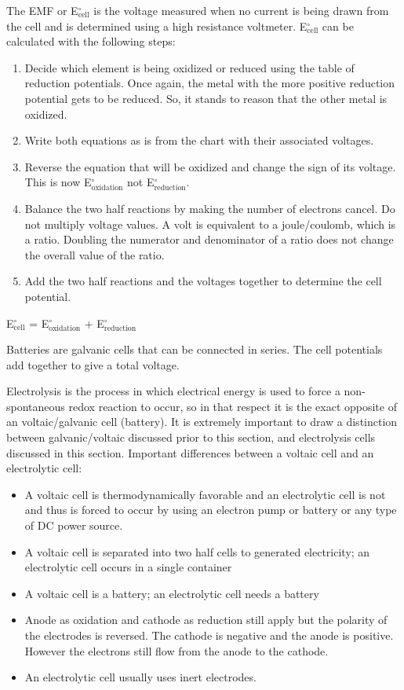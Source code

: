 \documentclass[../chem.tex]{subfiles}
\begin{document}
The EMF or E$^{\circ}_{\text{cell}}$ is the voltage measured when no current is being drawn from the cell and is determined using a high 
resistance voltmeter. E$^{\circ}_{\text{cell}}$ can be calculated with the following steps:
\begin{enumerate}
    \item Decide which element is being oxidized or reduced using the table of reduction potentials. Once again, the metal with the more positive reduction potential gets to be reduced. So, it stands to reason that the other metal is oxidized.
    \item Write both equations as is from the chart with their associated voltages.
    \item Reverse the equation that will be oxidized and change the sign of its voltage. This is now E$^{\circ}_{\text{oxidation}}$ not E$^{\circ}_{\text{reduction}}$.
    \item Balance the two half reactions by making the number of electrons cancel. Do not multiply voltage values. A volt is equivalent to a joule/coulomb, which is a ratio. Doubling the numerator and denominator of a ratio does not change the overall value of the ratio.
    \item Add the two half reactions and the voltages together to determine the cell potential.
\end{enumerate}
\begin{center}
    E$^{\circ}_{\text{cell}}$ = E$^{\circ}_{\text{oxidation}}$ + E$^{\circ}_{\text{reduction}}$
\end{center}

Batteries are galvanic cells that can be connected in series. The cell potentials add together to give a total voltage.

Electrolysis is the process in which electrical energy is used to force a non-spontaneous redox reaction to occur, so in that respect 
it is the exact opposite of an voltaic/galvanic cell (battery). It is extremely important to draw a distinction between galvanic/voltaic discussed 
prior to this section, and electrolysis cells discussed in this section. Important differences between a voltaic cell and an electrolytic cell:
\begin{itemize}
    \item A voltaic cell is thermodynamically favorable and an electrolytic cell is not and thus is forced to occur by using an electron pump or battery or any type of DC power source.
    \item A voltaic cell is separated into two half cells to generated electricity; an electrolytic cell occurs in a single container 
    \item A voltaic cell is a battery; an electrolytic cell needs a battery 
    \item Anode as oxidation and cathode as reduction still apply but the polarity of the electrodes is reversed. The cathode is negative and the anode is positive. However the electrons still flow from the anode to the cathode.
    \item An electrolytic cell usually uses inert electrodes.
\end{itemize}
\end{document}
